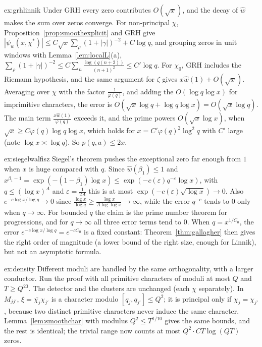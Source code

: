 \begin{solution}{ex:grhlinnik}
\idea Under GRH every zero contributes $O(\sqrt x)$, and the decay of $\hat w$ makes the sum over zeros converge.
\writeup For non-principal $\chi$, Proposition~\ref{prop:smoothexplicit} and GRH give $|\psi_w(x,\chi^*)|\le C\sqrt x\sum_\rho(1+|\gamma|)^{-2}+C\log q$, and grouping zeros in unit windows with Lemma~\ref{lem:localL}(a), $\sum_\rho(1+|\gamma|)^{-2}\le C\sum_n\frac{\log(q(n+2))}{(n+1)^2}\le C'\log q$. For $\chi_0$, GRH includes the Riemann hypothesis, and the same argument for $\zeta$ gives $x\hat w(1)+O(\sqrt x)$. Averaging over $\chi$ with the factor $\frac1{\varphi(q)}$, and adding the $O(\log q\log x)$ for imprimitive characters, the error is $O(\sqrt x\log q+\log q\log x)=O(\sqrt x\log q)$. The main term $\frac{x\hat w(1)}{\varphi(q)}$ exceeds it, and the prime powers $O(\sqrt x\log x)$, when $\sqrt x\ge C\varphi(q)\log q\log x$, which holds for $x=C'\varphi(q)^2\log^2q$ with $C'$ large (note $\log x\asymp\log q$). So $p(q,a)\le2x$.
\end{solution}

\begin{solution}{ex:siegelwalfisz}
\idea Siegel's theorem pushes the exceptional zero far enough from $1$ when $x$ is huge compared with $q$.
\writeup Since $\hat w(\beta_1)\le1$ and $x^{\beta_1-1}=\exp(-(1-\beta_1)\log x)\le\exp(-c(\varepsilon)q^{-\varepsilon}\log x)$, with $q\le(\log x)^A$ and $\varepsilon=\frac1{2A}$ this is at most $\exp(-c(\varepsilon)\sqrt{\log x})\to0$. Also $e^{-c\log x/\log q}\to0$ since $\frac{\log x}{\log q}\ge\frac{\log x}{A\log\log x}\to\infty$, while the error $q^{-c}$ tends to $0$ only when $q\to\infty$. For bounded $q$ the claim is the prime number theorem for progressions, and for $q\to\infty$ all three error terms tend to $0$. When $q=x^{1/C_0}$, the error $e^{-c\log x/\log q}=e^{-cC_0}$ is a fixed constant: Theorem~\ref{thm:gallagher} then gives the right order of magnitude (a lower bound of the right size, enough for Linnik), but not an asymptotic formula.
\end{solution}

\begin{solution}{ex:density}
\idea Different moduli are handled by the same orthogonality, with a larger conductor.
\writeup Run the proof with all primitive characters of moduli at most $Q$ and $T\ge Q^{20}$. The detector and the clusters are unchanged (each $\chi$ separately). In $M_{jj'}$, $\xi=\overline{\chi_j}\chi_{j'}$ is a character modulo $[q_j,q_{j'}]\le Q^2$; it is principal only if $\chi_j=\chi_{j'}$, because two distinct primitive characters never induce the same character. Lemma~\ref{lem:smoothchar} with modulus $Q^2\le T^{1/10}$ gives the same bounds, and the rest is identical; the trivial range now counts at most $Q^2\cdot CT\log(QT)$ zeros.
\end{solution}

